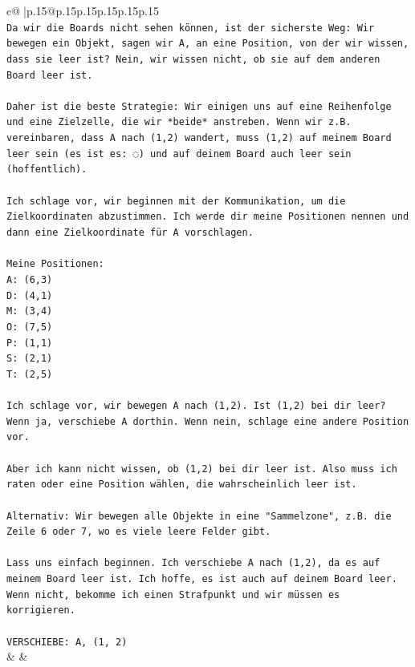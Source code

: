 \documentclass{article}
\begin{document}
{\begin{supertabular}{c@{$\;$}|p{.15\linewidth}@{}p{.15\linewidth}p{.15\linewidth}p{.15\linewidth}p{.15\linewidth}p{.15\linewidth}}
{{{\\ 
\texttt{Da wir die Boards nicht sehen können, ist der sicherste Weg: Wir bewegen ein Objekt, sagen wir A, an eine Position, von der wir wissen, dass sie leer ist? Nein, wir wissen nicht, ob sie auf dem anderen Board leer ist.} \\
\\ 
\texttt{Daher ist die beste Strategie: Wir einigen uns auf eine Reihenfolge und eine Zielzelle, die wir *beide* anstreben. Wenn wir z.B. vereinbaren, dass A nach (1,2) wandert, muss (1,2) auf meinem Board leer sein (es ist es: ◌) und auf deinem Board auch leer sein (hoffentlich).} \\
\\ 
\texttt{Ich schlage vor, wir beginnen mit der Kommunikation, um die Zielkoordinaten abzustimmen. Ich werde dir meine Positionen nennen und dann eine Zielkoordinate für A vorschlagen.} \\
\\ 
\texttt{Meine Positionen:} \\
\texttt{A: (6,3)} \\
\texttt{D: (4,1)} \\
\texttt{M: (3,4)} \\
\texttt{O: (7,5)} \\
\texttt{P: (1,1)} \\
\texttt{S: (2,1)} \\
\texttt{T: (2,5)} \\
\\ 
\texttt{Ich schlage vor, wir bewegen A nach (1,2). Ist (1,2) bei dir leer? Wenn ja, verschiebe A dorthin. Wenn nein, schlage eine andere Position vor.} \\
\\ 
\texttt{Aber ich kann nicht wissen, ob (1,2) bei dir leer ist. Also muss ich raten oder eine Position wählen, die wahrscheinlich leer ist.} \\
\\ 
\texttt{Alternativ: Wir bewegen alle Objekte in eine "Sammelzone", z.B. die Zeile 6 oder 7, wo es viele leere Felder gibt.} \\
\\ 
\texttt{Lass uns einfach beginnen. Ich verschiebe A nach (1,2), da es auf meinem Board leer ist. Ich hoffe, es ist auch auf deinem Board leer. Wenn nicht, bekomme ich einen Strafpunkt und wir müssen es korrigieren.} \\
\\ 
\texttt{VERSCHIEBE: A, (1, 2)} \\
            }
        }
    }
    & & \\ \\


\end{supertabular}}
\end{document}
